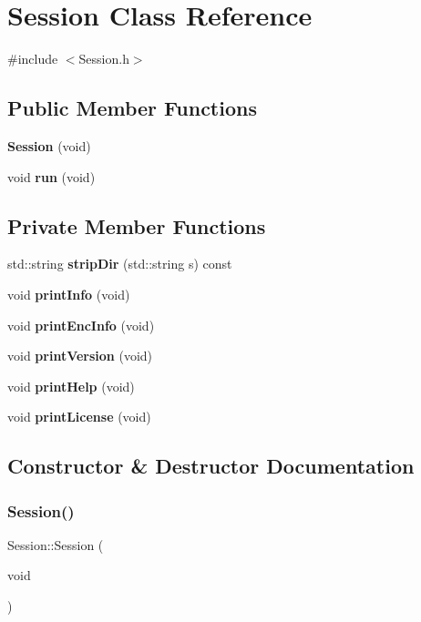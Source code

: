 \section{Session Class Reference}
\label{classSession}


{\ttfamily \#include $<$Session.\+h$>$}

\subsection*{Public Member Functions}
\begin{DoxyCompactItemize}
\item 
\textbf{ Session} (void)
\item 
void \textbf{ run} (void)
\end{DoxyCompactItemize}
\subsection*{Private Member Functions}
\begin{DoxyCompactItemize}
\item 
std\+::string \textbf{ strip\+Dir} (std\+::string s) const
\item 
void \textbf{ print\+Info} (void)
\item 
void \textbf{ print\+Enc\+Info} (void)
\item 
void \textbf{ print\+Version} (void)
\item 
void \textbf{ print\+Help} (void)
\item 
void \textbf{ print\+License} (void)
\end{DoxyCompactItemize}


\subsection{Constructor \& Destructor Documentation}
\mbox{\label{classSession_a06ddc1afdaa636fde37e1f02f503b4c7}} 
\subsubsection{Session()}
{\footnotesize\ttfamily Session\+::\+Session (\begin{DoxyParamCaption}\item[{void}]{ }\end{DoxyParamCaption})\hspace{0.3cm}{\ttfamily [inline]}}



